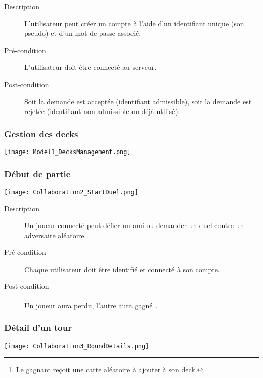 \documentclass{article}
\begin{document}
            \begin{description}
                \item[Description] L'utilisateur peut créer un compte à l'aide d'un identifiant unique (son pseudo) et d'un mot de passe associé.
                \item[Pré-condition] L'utilisateur doit être connecté au serveur.
                \item[Post-condition] Soit la demande est acceptée (identifiant admissible), soit la demande est rejetée (identifiant non-admissible ou déjà utilisé).
            \end{description}

        \subsubsection{Gestion des \glspl{deck}}
            \begin{center}\texttt{[image: Model1\_DecksManagement.png]}\end{center}

        \subsubsection{Début de partie}
            \begin{center}\texttt{[image: Collaboration2\_StartDuel.png]}\end{center}

            \begin{description}
                \item[Description] Un joueur connecté peut défier un ami ou demander un duel contre un adversaire aléatoire.
                \item[Pré-condition] Chaque utilisateur doit être identifié et connecté à son compte.
                \item[Post-condition] Un joueur aura perdu, l'autre aura gagné\footnote{Le gagnant reçoit une carte aléatoire à ajouter à son \gls{deck}.}.
            \end{description}

        \subsubsection{Détail d'un tour}
            \begin{center}\texttt{[image: Collaboration3\_RoundDetails.png]}\end{center}
\end{document}

